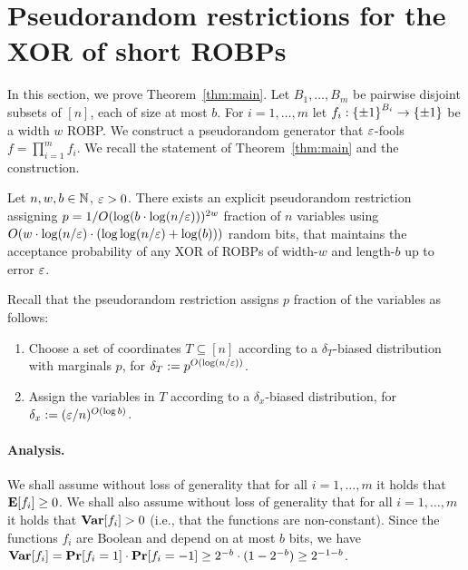 \newcommand{\Tvar}{\mathbf{{Tvar}}}

\section{Pseudorandom restrictions for the XOR of short ROBPs}
In this section, we prove Theorem~\ref{thm:main}. 
Let $B_1, \ldots, B_m$ be pairwise disjoint subsets of $[n]$, each of size at most $b$. For $i=1, \ldots, m$ let $f_i : {\{\pm1\}}^{B_i} \to {\{\pm1\}}$ be a width $w$ ROBP. We construct a pseudorandom generator that $\varepsilon$-fools $f = \prod_{i=1}^{m}{f_i}$.
We recall the statement of Theorem~\ref{thm:main} and the construction.
\begin{theorem}Let $n,w,b\in {\mathbb{N}}$, $\varepsilon>0$. There exists an explicit pseudorandom restriction assigning $p = 1/O(\log(b \cdot \log(n/\varepsilon)))^{2w}$ fraction of  $n$ variables using $O(w \cdot \log (n/\varepsilon) \cdot (\log\log(n/\varepsilon) + \log(b)))$ random bits, that maintains the acceptance probability of any XOR of ROBPs of width-$w$ and length-$b$ up to error $\varepsilon$.
\end{theorem}

Recall that the pseudorandom restriction assigns $p$ fraction of the variables as follows: 
\begin{enumerate}
	\item Choose a set of coordinates $T \subseteq [n]$ according to a $\delta_T$-biased distribution with marginals $p$, for $\delta_T := p^{ O(\log(n/\varepsilon))}$.
	\item Assign the variables in $T$ according to a $\delta_x$-biased distribution, for $\delta_x := (\varepsilon/n)^{O(\log b)}$.
\end{enumerate}

\paragraph{Analysis.} We shall assume without loss of generality that for all $i=1, \ldots, m$  it holds that $\mathop{\bf E\/}[f_i] \ge 0$.
We shall also assume without loss of generality that for all $i=1, \ldots, m$ it holds that ${\mathop{\bf Var\/}}[f_i] > 0$ (i.e., that the functions are non-constant). 
Since the functions $f_i$ are Boolean and depend on at most $b$ bits, 
we have ${\mathop{\bf Var\/}}[f_i] =\mathop{\bf Pr\/}[f_i=1]\cdot \mathop{\bf Pr\/}[f_i=-1] \ge  2^{-b}\cdot(1-2^{-b}) \ge 2^{-1-b}$.

